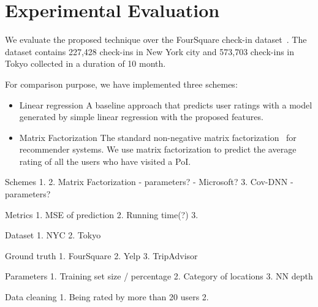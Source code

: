 \section{Experimental Evaluation}\label{sec:exp}

We evaluate the proposed technique over the FourSquare check-in dataset~\cite{yang2014modeling}. The dataset contains 227,428 check-ins in New York city and 573,703 check-ins in Tokyo collected in a duration of 10 month. 

For comparison purpose, we have implemented three schemes:
\begin{itemize}

\item{Linear regression} A baseline approach that predicts user ratings with a model generated by simple linear regression with the proposed features.

\item{Matrix Factorization} The standard non-negative matrix factorization~\cite{koren2009matrix} for recommender systems. We use matrix factorization to predict the average rating of all the users who have visited a PoI.

\end{itemize}


Schemes
1. 
2. Matrix Factorization - parameters? - Microsoft?
3. Cov-DNN - parameters?

Metrics
1. MSE of prediction
2. Running time(?)
3. 

Dataset
1. NYC
2. Tokyo

Ground truth
1. FourSquare
2. Yelp
3. TripAdvisor

Parameters
1. Training set size / percentage
2. Category of locations
3. NN depth

Data cleaning
1. Being rated by more than 20 users
2. 